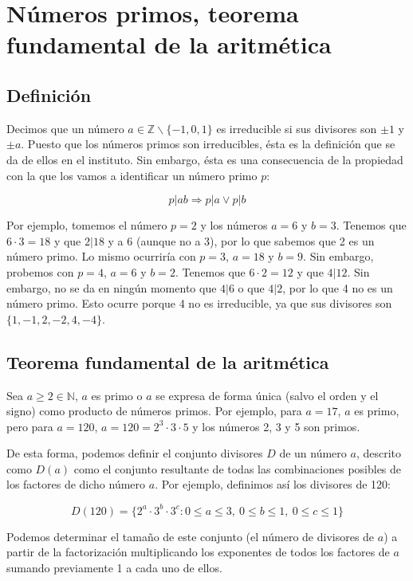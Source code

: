 \section{Números primos, teorema fundamental de la aritmética}\label{numeros-primos-teorema-fundamental-de-la-aritmetica}

\subsection{Definición}

Decimos que un número $a \in\mathbb{Z}\backslash\{-1,0,1\}$ es irreducible si sus divisores son $\pm 1$ y $\pm a$.
Puesto que los números primos son irreducibles, ésta es la definición que se da de ellos en el instituto.
Sin embargo, ésta es una consecuencia de la propiedad con la que los vamos a identificar un número primo $p$:

\[p|ab \Rightarrow p|a \lor p|b\]

Por ejemplo, tomemos el número $p=2$ y los números $a=6$ y $b=3$.
Tenemos que $6 \cdot 3 = 18$ y que $2|18$ y a 6 (aunque no a 3), por lo que sabemos que 2 es un número primo.
Lo mismo ocurriría con $p=3$, $a=18$ y $b=9$.
Sin embargo, probemos con $p=4$, $a=6$ y $b=2$.
Tenemos que $6 \cdot 2 = 12$ y que $4|12$.
Sin embargo, no se da en ningún momento que $4|6$ o que $4|2$, por lo que 4 no es un número primo.
Esto ocurre porque 4 no es irreducible, ya que sus divisores son $\{1, -1, 2, -2, 4, -4\}$.

\subsection{Teorema fundamental de la aritmética}

Sea $a \geq 2 \in\mathbb{N}$, $a$ es primo o $a$ se expresa de forma única (salvo el orden y el signo) como producto de números primos.
Por ejemplo, para $a = 17$, $a$ es primo, pero para $a = 120$, $a = 120 = 2^3 \cdot 3 \cdot 5$ y los números 2, 3 y 5 son primos.

De esta forma, podemos definir el conjunto divisores $D$ de un número $a$, descrito como $D(a)$ como el conjunto resultante de todas las combinaciones posibles de los factores de dicho número $a$.
Por ejemplo, definimos así los divisores de 120:

\[D(120) = \{2^a \cdot 3^b \cdot 3^c : 0 \leq a \leq 3,\ 0 \leq b \leq 1,\ 0 \leq c \leq 1\}\]

Podemos determinar el tamaño de este conjunto (el número de divisores de $a$) a partir de la factorización multiplicando los exponentes de todos los factores de $a$ sumando previamente 1 a cada uno de ellos.
